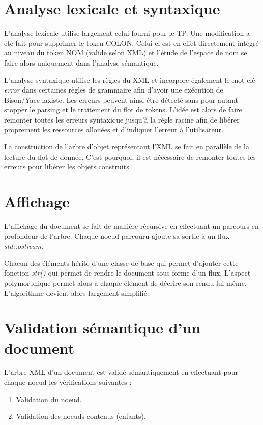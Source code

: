 \documentclass[10pt, a4paper]{article}
\begin{document}
\section{Analyse lexicale et
syntaxique}\label{analyse-lexicale-et-syntaxique}

L'analyse lexicale utilise largement celui fourni pour le TP. Une
modification a été fait pour supprimer le token COLON. Celui-ci est en
effet directement intégré au niveau du token NOM (valide selon XML) et
l'étude de l'espace de nom se faire alors uniquement dans l'analyse
sémantique.

L'analyse syntaxique utilise les règles du XML et incorpore également le
mot clé \emph{error} dans certaines règles de grammaire afin d'avoir une
exécution de Bison/Yacc laxiste. Les erreurs peuvent ainsi être détecté
sans pour autant stopper le parsing et le traitement du flot de tokens.
L'idée est alors de faire remonter toutes les erreurs syntaxique jusqu'à
la règle racine afin de libérer proprement les ressources allouées et
d'indiquer l'erreur à l'utilisateur.

La construction de l'arbre d'objet représentant l'XML se fait en
parallèle de la lecture du flot de donnée. C'est pourquoi, il est
nécessaire de remonter toutes les erreurs pour libérer les objets
construits.

\section{Affichage}\label{affichage}

L'affichage du document se fait de manière récursive en effectuant un
parcours en profondeur de l'arbre. Chaque noeud parcouru ajoute sa
sortie à un flux \emph{std::ostream}.

Chacun des éléments hérite d'une classe de base qui permet d'ajouter
cette fonction \emph{str()} qui permet de rendre le document sous forme
d'un flux. L'aspect polymorphique permet alors à chaque élément de
décrire son rendu lui-même. L'algorithme devient alors largement
simplifié.

\section{Validation sémantique d'un
document}\label{validation-suxe9mantique-dun-document}

L'arbre XML d'un document est validé sémantiquement en effectuant pour
chaque noeud les vérifications suivantes :

\begin{enumerate}
\def\labelenumi{\arabic{enumi}.}
\itemsep1pt\parskip0pt
\item
  Validation du noeud.
\item
  Validation des noeuds contenus (enfants).
\end{enumerate}
\end{document}
